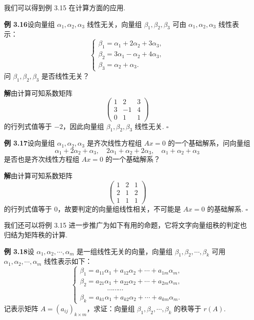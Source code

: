 \documentclass[UTF8, 12pt, fontset=fandol, oneside]{ctexart}
\begin{document}
我们可以得到例 3.15 在计算方面的应用.

\noindent\textbf{例 3.16}\quad 设向量组 $\alpha_1,\alpha_2,\alpha_3$ 线性无关，向量组 $\beta_1,\beta_2,\beta_3$ 可由 $\alpha_1,\alpha_2,\alpha_3$ 线性表示：
\[
\left\{
\begin{array}{l}
\beta_1=\alpha_1+2\alpha_2+3\alpha_3,\\
\beta_2=3\alpha_1-\alpha_2+4\alpha_3,\\
\beta_3=\alpha_2+\alpha_3.
\end{array}
\right.
\]
问 $\beta_1,\beta_2,\beta_3$ 是否线性无关？

\noindent\textbf{解}\quad 由计算可知系数矩阵
\[
\begin{pmatrix}
1 & 2 & 3\\
3 & -1 & 4\\
0 & 1 & 1
\end{pmatrix}
\]
的行列式值等于 $-2$，因此向量组 $\beta_1,\beta_2,\beta_3$ 线性无关. $\square$

\noindent\textbf{例 3.17}\quad 设向量组 $\alpha_1,\alpha_2,\alpha_3$ 是齐次线性方程组 $Ax=0$ 的一个基础解系，问向量组
\[
\alpha_1+2\alpha_2+\alpha_3,\quad 2\alpha_1+\alpha_2+2\alpha_3,\quad \alpha_1+\alpha_2+\alpha_3
\]
是否也是齐次线性方程组 $Ax=0$ 的一个基础解系？

\noindent\textbf{解}\quad 由计算可知系数矩阵
\[
\begin{pmatrix}
1 & 2 & 1\\
2 & 1 & 2\\
1 & 1 & 1
\end{pmatrix}
\]
的行列式值等于 0，故要判定的向量组线性相关，不可能是 $Ax=0$ 的基础解系. $\square$

我们还可以将例 3.15 进一步推广为如下有用的命题，它将文字向量组秩的判定也归结为矩阵秩的计算.

\noindent\textbf{例 3.18}\quad 设 $\alpha_1,\alpha_2,\cdots,\alpha_m$ 是一组线性无关的向量，向量组 $\beta_1,\beta_2,\cdots,\beta_k$ 可用 $\alpha_1,\alpha_2,\cdots,\alpha_m$ 线性表示如下：
\[
\left\{
\begin{array}{l}
\beta_1=a_{11}\alpha_1+a_{12}\alpha_2+\cdots+a_{1m}\alpha_m,\\
\beta_2=a_{21}\alpha_1+a_{22}\alpha_2+\cdots+a_{2m}\alpha_m,\\
\hspace{4em}\cdots\cdots\cdots\\
\beta_k=a_{k1}\alpha_1+a_{k2}\alpha_2+\cdots+a_{km}\alpha_m.
\end{array}
\right.
\]
记表示矩阵 $A=(a_{ij})_{k\times m}$，求证：向量组 $\beta_1,\beta_2,\cdots,\beta_k$ 的秩等于 $r(A)$.
\end{document}
